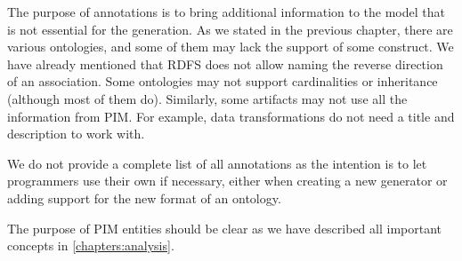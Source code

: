 The purpose of annotations is to bring additional information to the model that is not essential for the generation. As we stated in the previous chapter, there are various ontologies, and some of them may lack the support of some construct. We have already mentioned that RDFS does not allow naming the reverse direction of an association. Some ontologies may not support cardinalities or inheritance (although most of them do). Similarly, some artifacts may not use all the information from PIM. For example, data transformations do not need a title and description to work with.

We do not provide a complete list of all annotations as the intention is to let programmers use their own if necessary, either when creating a new generator or adding support for the new format of an ontology.

The purpose of PIM entities should be clear as we have described all important concepts in \autoref{chapters:analysis}.

